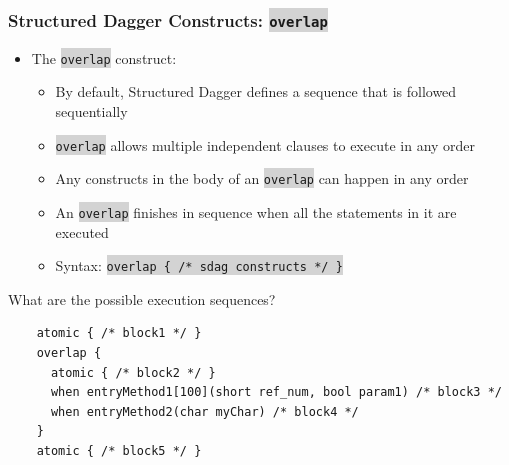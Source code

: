 \documentclass{beamer}
\newcommand{\code}[1]{\colorbox{lightgray}{\texttt{#1}}}
\begin{document}
\begin{frame}[fragile]
  \frametitle{Structured Dagger Constructs: \code{overlap}}
  \begin{itemize}
  \item The \code{overlap} construct:
    \begin{itemize}
    \item By default, Structured Dagger defines a sequence that is followed sequentially
    \item \code{overlap} allows multiple independent clauses to execute in any order
    \item Any constructs in the body of an \code{overlap} can happen in any
      order
    \item An \code{overlap} finishes in sequence when all the statements in it
      are executed
    \item Syntax: \code{overlap \{ /* sdag constructs */ \}}
    \end{itemize}
  \end{itemize}
  What are the possible execution sequences?
  \begin{lstlisting}
    atomic { /* block1 */ }
    overlap {
      atomic { /* block2 */ }
      when entryMethod1[100](short ref_num, bool param1) /* block3 */
      when entryMethod2(char myChar) /* block4 */
    }
    atomic { /* block5 */ }
  \end{lstlisting}
\end{frame}
\end{document}
